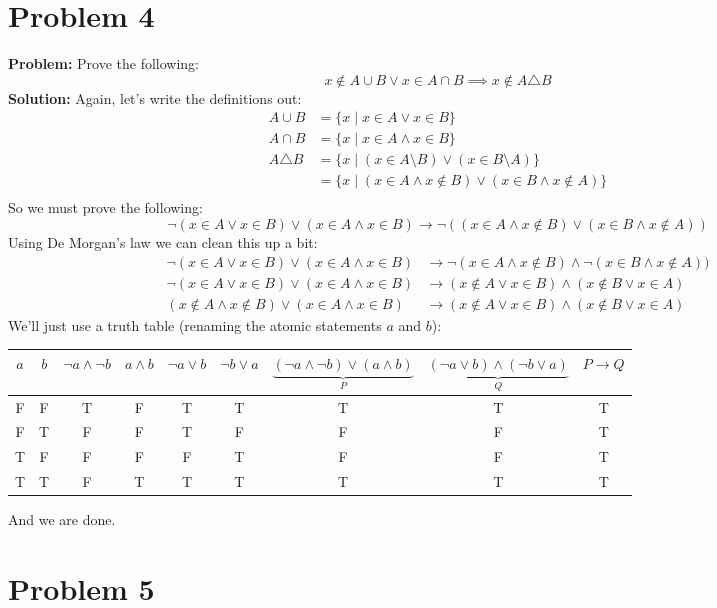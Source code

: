 \documentclass{article}
\begin{document}
\section*{Problem 4}
\textbf{Problem:} Prove the following:
$$x\not\in A\cup B \vee x\in A\cap B\implies x\not\in A\triangle B$$
\textbf{Solution:} Again, let's write the definitions out:
\begin{align*}
  A\cup B&=\{x\mid x\in A\vee x\in B\}\\
  A\cap B&=\{x\mid x\in A\wedge x\in B\}\\
  A\triangle B&=\{x\mid (x\in A\setminus B)\vee (x\in B\setminus A)\}\\
  &=\{x\mid (x\in A\wedge x\not\in B)\vee (x\in B\wedge x\not\in A)\}\\
\end{align*}
So we must prove the following:
$$\neg(x\in A\vee x\in B)\vee (x\in A\wedge x\in B)\rightarrow \neg((x\in A\wedge x\not\in B)\vee (x\in B\wedge x\not\in A))$$
Using De Morgan's law we can clean this up a bit:
\begin{align*}
\neg(x\in A\vee x\in B)\vee (x\in A\wedge x\in B)&\rightarrow \neg(x\in A\wedge x\not\in B)\wedge \neg(x\in B\wedge x\not\in A))\\
\neg(x\in A\vee x\in B)\vee (x\in A\wedge x\in B)&\rightarrow (x\not\in A\vee x\in B)\wedge (x\not\in B\vee x\in A)\\
(x\not\in A\wedge x\not\in B)\vee (x\in A\wedge x\in B)&\rightarrow (x\not\in A\vee x\in B)\wedge (x\not\in B\vee x\in A)
\end{align*}
We'll just use a truth table (renaming the atomic statements $a$ and $b$):
\begin{center}
\begin{tabular}{c|c|c|c|c|c|c|c|c}
$a$ & $b$ & $\neg a\wedge \neg b$ & $a\wedge b$ & $\neg a\vee b$ & $\neg b\vee a$ & $\underbrace{(\neg a\wedge\neg b)\vee (a\wedge b)}_{P}$ & $\underbrace{(\neg a\vee b)\wedge (\neg b\vee a)}_{Q}$ & $P\rightarrow Q$ \\
\hline
F&F& T&F&T&T&T&T&T\\
F&T& F&F&T&F&F&F&T\\
T&F& F&F&F&T&F&F&T\\
T&T& F&T&T&T&T&T&T
\end{tabular}
\end{center}
And we are done.

\section*{Problem 5}
\end{document}
